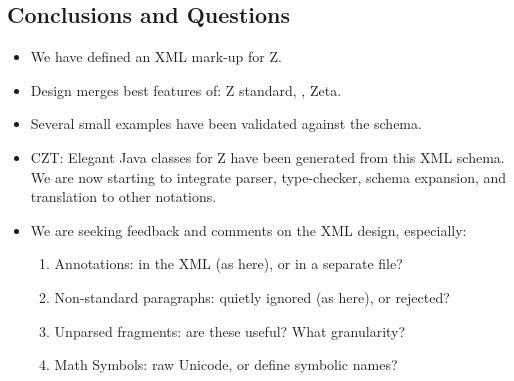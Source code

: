 \documentclass[%
   slidesonly,%
   semhelv,%
   landscape]{seminar}
\newcommand{\Zeta}{Zeta}
\begin{document}
  
\begin{slide}
\section{Conclusions and Questions}

\begin{itemize}
\item We have defined an XML mark-up for Z.
\item Design merges best features of: Z standard, \CADiZ, \Zeta.
\item Several small examples have been validated against the schema.
\item CZT: Elegant Java classes for Z have been generated from this XML
  schema.  We are now starting to integrate parser, type-checker, schema
  expansion, and translation to other notations.
\item We are seeking feedback and comments on the XML design, especially:
  \begin{enumerate}
  \item Annotations: in the XML (as here), or in a separate file?
  \item Non-standard paragraphs: quietly ignored (as here), or rejected?
  \item Unparsed fragments:  are these useful?  What granularity?
  \item Math Symbols: raw Unicode, or define symbolic names?
  \end{enumerate}
\end{itemize}
\end{slide}
\end{document}

